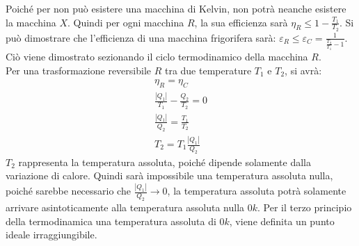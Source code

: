 \documentclass{article}
\numberwithin{equation}{subsection}
\begin{document}
\begin{center}\end{center}

Poiché per non può esistere una macchina di Kelvin, non potrà neanche esistere la macchina $X$. Quindi per ogni macchina $R$, la sua efficienza sarà 
$\eta_R\leq1-\displaystyle\frac{T_1}{T_2}$. Si può dimostrare che l'efficienza di una macchina frigorifera sarà: 
$\varepsilon_R\leq\varepsilon_C=\displaystyle\frac{1}{\displaystyle\frac{T_2}{T_1}-1}$. Ciò viene dimostrato sezionando il ciclo termodinamico della macchina $R$. \\
Per una trasformazione reversibile $R$ tra due temperature $T_1$ e $T_2$, si avrà:
\begin{gather}
    \eta_R=\eta_C \\
    \displaystyle\frac{|Q_1|}{T_1}-\frac{Q_2}{T_2}=0\\
    \displaystyle\frac{|Q_1|}{Q_2}=\frac{T_1}{T_2}\\
    T_2=T_1\displaystyle\frac{|Q_1|}{Q_2}
\end{gather}
$T_2$ rappresenta la temperatura assoluta, poiché dipende solamente dalla variazione di calore. Quindi sarà impossibile una temperatura assoluta nulla, poiché sarebbe 
necessario che $\displaystyle\frac{|Q_1|}{Q_2}\to 0$, la temperatura assoluta potrà solamente arrivare asintoticamente alla temperatura assoluta nulla $0k$. 
Per il terzo principio della termodinamica una temperatura assoluta di $0k$, viene definita un punto ideale irraggiungibile. 
\end{document}
